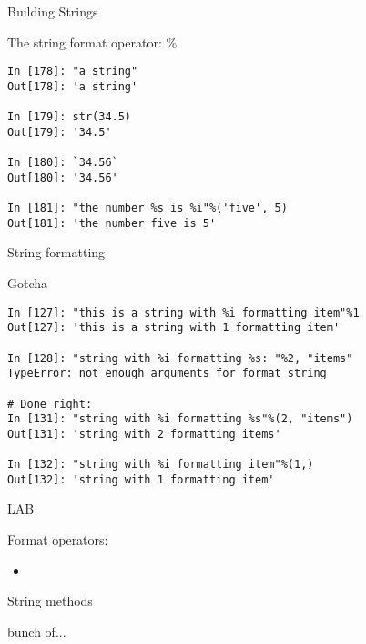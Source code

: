 \documentclass{beamer}
\begin{document}
\begin{frame}[fragile]{Building Strings}

{\Large The string format operator: \%}

\begin{verbatim}
In [178]: "a string"
Out[178]: 'a string'

In [179]: str(34.5)
Out[179]: '34.5'

In [180]: `34.56`
Out[180]: '34.56'

In [181]: "the number %s is %i"%('five', 5)
Out[181]: 'the number five is 5'
\end{verbatim}

\end{frame} 

\begin{frame}[fragile]{String formatting}

{\Large Gotcha}

\begin{verbatim}
In [127]: "this is a string with %i formatting item"%1 
Out[127]: 'this is a string with 1 formatting item'

In [128]: "string with %i formatting %s: "%2, "items" 
TypeError: not enough arguments for format string

# Done right:
In [131]: "string with %i formatting %s"%(2, "items")
Out[131]: 'string with 2 formatting items'

In [132]: "string with %i formatting item"%(1,)
Out[132]: 'string with 1 formatting item' 
\end{verbatim}

\end{frame}

\begin{frame}{LAB}

{\Large Format operators:}
\begin{itemize}
  \item
\end{itemize}

\end{frame}



\begin{frame}{String methods}

  {\Large bunch of...}

\end{frame}
\end{document}
